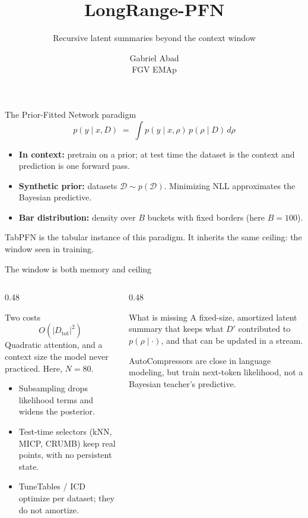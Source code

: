 \documentclass[aspectratio=169,10pt]{beamer}
\title{LongRange-PFN}
\subtitle{Recursive latent summaries beyond the context window}
\author{Gabriel Abad \\ FGV EMAp}
\date{}
\newcommand{\Dtot}{D_{\mathrm{tot}}}
\newcommand{\Dfar}{D'}
\begin{document}
\begin{frame}
  \titlepage
\end{frame}

\begin{frame}{The Prior-Fitted Network paradigm}
  \[
    p(y \mid x, D)
    \;=\;
    \int p(y \mid x, \rho)\, p(\rho \mid D)\, d\rho
  \]
  \begin{itemize}
    \item \textbf{In context:} pretrain on a prior; at test time the dataset is the context and prediction is one forward pass.
    \item \textbf{Synthetic prior:} datasets \(\mathcal{D} \sim p(\mathcal{D})\). Minimizing NLL approximates the Bayesian predictive.
    \item \textbf{Bar distribution:} density over \(B\) buckets with fixed borders (here \(B=100\)).
  \end{itemize}
  \vspace{0.6em}
  \footnotesize TabPFN is the tabular instance of this paradigm. It inherits the same ceiling: the window seen in training.
\end{frame}

\begin{frame}{The window is both memory and ceiling}
  \begin{columns}[T]
    \begin{column}{0.48\textwidth}
      \begin{block}{Two costs}
        \[
          O(|\Dtot|^2)
        \]
        Quadratic attention, and a context size the model never practiced.
        Here, \(N=80\).
      \end{block}
      \begin{itemize}
        \item Subsampling drops likelihood terms and widens the posterior.
        \item Test-time selectors (kNN, MICP, CRUMB) keep real points, with no persistent state.
        \item TuneTables / ICD optimize per dataset; they do not amortize.
      \end{itemize}
    \end{column}
    \begin{column}{0.48\textwidth}
      \begin{alertblock}{What is missing}
        A fixed-size, amortized latent summary that keeps what \(\Dfar\)
        contributed to \(p(\rho \mid \cdot)\), and that can be updated in a stream.
      \end{alertblock}
      \footnotesize AutoCompressors are close in language modeling, but train next-token likelihood,
      not a Bayesian teacher's predictive.
    \end{column}
  \end{columns}
\end{frame}
\end{document}
